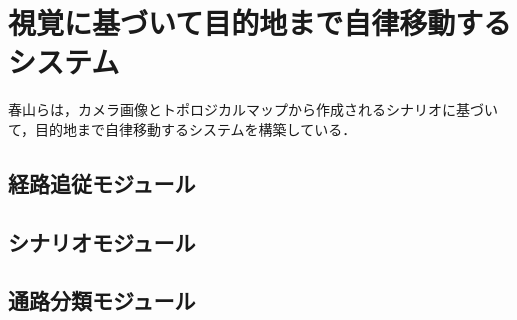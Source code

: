 \section{視覚に基づいて目的地まで自律移動するシステム}
春山らは，カメラ画像とトポロジカルマップから作成されるシナリオに基づいて，目的地まで自律移動するシステムを構築している．

\subsection{経路追従モジュール}
\subsection{シナリオモジュール}
\subsection{通路分類モジュール}